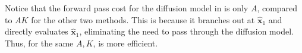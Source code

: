 Notice that the forward pass cost for the diffusion model in \xcleansampling is only $A$, compared to $AK$ for the other two methods. This is because it branches out at $\hat{\boldsymbol{x}}_1$ and directly evaluates $\hat{\boldsymbol{x}}_1$, eliminating the need to pass through the diffusion model. Thus, for the same $A, K$, \xcleansampling is more efficient.

